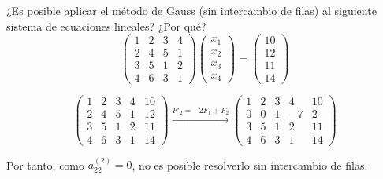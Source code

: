 \begin{ejercicio}
    ¿Es posible aplicar el método de Gauss (sin intercambio de filas) al siguiente sistema de ecuaciones lineales? ¿Por qué?
    \begin{equation*}
        \left( \begin{array}{cccc}
            1 & 2 & 3 & 4 \\
            2 & 4 & 5 & 1 \\
            3 & 5 & 1 & 2 \\
            4 & 6 & 3 & 1
        \end{array}\right) \left( \begin{array}{c}
            x_1 \\
            x_2 \\
            x_3 \\
            x_4
        \end{array}\right) = \left( \begin{array}{c}
            10 \\
            12 \\
            11 \\
            14
        \end{array}\right)
    \end{equation*}

    \begin{equation*}
        \left(\begin{array}{cccc|c}
            1 & 2 & 3 & 4 & 10 \\
            2 & 4 & 5 & 1 & 12\\
            3 & 5 & 1 & 2 & 11\\
            4 & 6 & 3 & 1 & 14
        \end{array}
        \right) \xrightarrow{F'_2=-2F_1 + F_2}
        \left(\begin{array}{cccc|c}
            1 & 2 & 3 & 4 & 10 \\
            0 & 0 & 1 & -7 & 2\\
            3 & 5 & 1 & 2 & 11\\
            4 & 6 & 3 & 1 & 14
        \end{array}
        \right)
        \end{equation*}

        Por tanto, como $a_{22}^{(2)} = 0$, no es posible resolverlo sin intercambio de filas.
\end{ejercicio}

